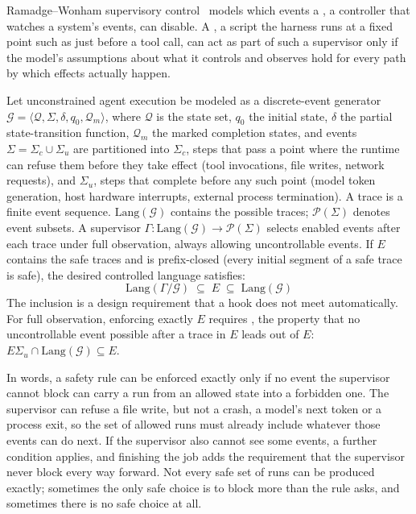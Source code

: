 Ramadge--Wonham supervisory control~ models
which events a , a controller that watches a system's events,
can disable. A , a script the harness runs at a fixed
point such as just before a tool call, can act as part of such a supervisor
only if the model's assumptions about what it controls and observes hold for
every path by which effects actually happen.

Let unconstrained agent execution be modeled as a discrete-event generator $\mathcal G = \langle \mathcal Q, \Sigma, \delta, q_0, \mathcal Q_m \rangle$, where $\mathcal Q$ is the state set, $q_0$ the initial state, $\delta$ the partial state-transition function, $\mathcal Q_m$ the marked completion states, and events $\Sigma = \Sigma_c \cup \Sigma_u$ are partitioned into  $\Sigma_c$, steps that pass a point where the runtime can refuse them before they take effect (tool invocations, file writes, network requests), and  $\Sigma_u$, steps that complete before any such point (model token generation, host hardware interrupts, external process termination). A trace is a finite event sequence. $\mathrm{Lang}(\mathcal G)$ contains the possible traces; $\mathcal P(\Sigma)$ denotes event subsets. A supervisor $\Gamma:\mathrm{Lang}(\mathcal G)\to\mathcal P(\Sigma)$ selects enabled events after each trace under full observation, always allowing uncontrollable events. If $E$ contains the safe traces and is prefix-closed (every initial segment of a safe trace is safe), the desired controlled language satisfies:
\begin{equation}
\mathrm{Lang}(\Gamma / \mathcal G) \;\subseteq\; E \;\subseteq\; \mathrm{Lang}(\mathcal G)
\end{equation}
The inclusion is a design requirement that a hook does not meet automatically. For full observation, enforcing exactly $E$ requires , the property that no uncontrollable event possible after a trace in $E$ leads out of $E$: $E\Sigma_u\cap \mathrm{Lang}(\mathcal G)\subseteq E$.

In words, a safety rule can be enforced exactly only if no event the supervisor cannot block can carry a run from an allowed state into a forbidden one. The supervisor can refuse a file write, but not a crash, a model's next token or a process exit, so the set of allowed runs must already include whatever those events can do next. If the supervisor also cannot see some events, a further condition applies, and finishing the job adds the requirement that the supervisor never block every way forward. Not every safe set of runs can be produced exactly; sometimes the only safe choice is to block more than the rule asks, and sometimes there is no safe choice at all.

